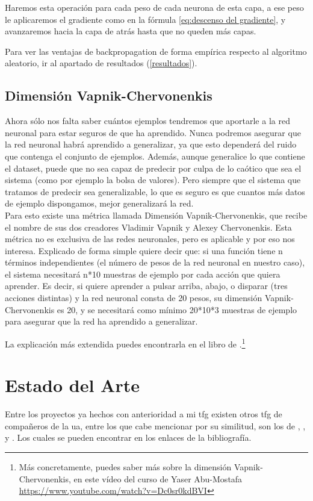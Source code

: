 Haremos esta operación para cada peso de cada neurona de esta capa, a ese peso le aplicaremos el gradiente como en la fórmula \ref{eq:descenso del gradiente}, y avanzaremos hacia la capa de atrás hasta que no queden más capas.

Para ver las ventajas de backpropagation de forma empírica respecto al algoritmo aleatorio, ir al apartado de resultados (\ref{resultados}).

\subsection{Dimensión Vapnik-Chervonenkis}
Ahora sólo nos falta saber cuántos ejemplos tendremos que aportarle a la red neuronal para estar seguros de que ha aprendido. Nunca podremos asegurar que la red neuronal habrá aprendido a generalizar, ya que esto dependerá del ruido que contenga el conjunto de ejemplos. Además, aunque generalice lo que contiene el dataset, puede que no sea capaz de predecir por culpa de lo caótico que sea el sistema (como por ejemplo la bolsa de valores). Pero siempre que el sistema que tratamos de predecir sea generalizable, lo que es seguro es que cuantos más datos de ejemplo dispongamos, mejor generalizará la red. 
\\
Para esto existe una métrica llamada Dimensión Vapnik-Chervonenkis, que recibe el nombre de sus dos creadores Vladimir Vapnik y Alexey Chervonenkis. Esta métrica no es exclusiva de las redes neuronales, pero es aplicable y por eso nos interesa. Explicado de forma simple quiere decir que: si una función tiene n términos independientes (el número de pesos de la red neuronal en nuestro caso), el sistema necesitará n*10 muestras de ejemplo por cada acción que quiera aprender. Es decir, si quiere aprender a pulsar arriba, abajo, o disparar (tres acciones distintas) y la red neuronal consta de 20 pesos, su dimensión Vapnik-Chervonenkis es 20, y se necesitará como mínimo 20*10*3 muestras de ejemplo para asegurar que la red ha aprendido a generalizar.

La explicación más extendida puedes encontrarla en el libro de \cite{LearningFromData}.\footnote{Más concretamente, puedes saber más sobre la dimensión Vapnik-Chervonenkis, en este vídeo del curso de Yaser Abu-Mostafa \url{https://www.youtube.com/watch?v=Dc0sr0kdBVI}}

\section{Estado del Arte}
Entre los proyectos ya hechos con anterioridad a mi \gls{tfg} existen otros \gls{tfg} de compañeros de la \gls{ua}, entre los que cabe mencionar por su similitud, son los de \cite{tfg-ia-1}, \cite{tfg-ia-2}, \cite{tfg-ia-3} y \cite{tfg-ia-4}. Los cuales se pueden encontrar en los enlaces de la bibliografía.

